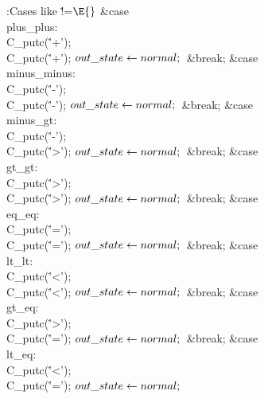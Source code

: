 \B{}:Cases like \.{!=}\X${}\E{}$\6
\4\hbox{\1\quad}\&{case} \\{plus\_plus}:\5
\\{C\_putc}(\.{'+'});\5
\\{C\_putc}(\.{'+'});\6
${}\\{out\_state}\leftarrow\\{normal};{}$\6
\&{break};\6
\4\&{case} \\{minus\_minus}:\5
\\{C\_putc}(\.{'-'});\5
\\{C\_putc}(\.{'-'});\6
${}\\{out\_state}\leftarrow\\{normal};{}$\6
\&{break};\6
\4\&{case} \\{minus\_gt}:\5
\\{C\_putc}(\.{'-'});\5
\\{C\_putc}(\.{'>'});\6
${}\\{out\_state}\leftarrow\\{normal};{}$\6
\&{break};\6
\4\&{case} \\{gt\_gt}:\5
\\{C\_putc}(\.{'>'});\5
\\{C\_putc}(\.{'>'});\6
${}\\{out\_state}\leftarrow\\{normal};{}$\6
\&{break};\6
\4\&{case} \\{eq\_eq}:\5
\\{C\_putc}(\.{'='});\5
\\{C\_putc}(\.{'='});\6
${}\\{out\_state}\leftarrow\\{normal};{}$\6
\&{break};\6
\4\&{case} \\{lt\_lt}:\5
\\{C\_putc}(\.{'<'});\5
\\{C\_putc}(\.{'<'});\6
${}\\{out\_state}\leftarrow\\{normal};{}$\6
\&{break};\6
\4\&{case} \\{gt\_eq}:\5
\\{C\_putc}(\.{'>'});\5
\\{C\_putc}(\.{'='});\6
${}\\{out\_state}\leftarrow\\{normal};{}$\6
\&{break};\6
\4\&{case} \\{lt\_eq}:\5
\\{C\_putc}(\.{'<'});\5
\\{C\_putc}(\.{'='});\6
${}\\{out\_state}\leftarrow\\{normal};{}$\6
